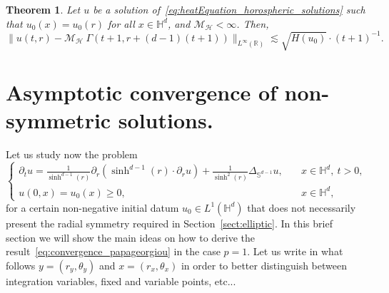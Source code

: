 \documentclass[12pt,longbibliography]{article}
\def\R{\mathbb{R}}
\def\d{\,\mathrm{d}}
\def\R{\mathbb{R}}
\def\d{\,\mathrm{d}}
\def\H{\mathbb{H}}
\newtheorem{thm}{Theorem}[section]
\theoremstyle{definition}
\theoremstyle{remark}
\theoremstyle{example}
\begin{document}
\begin{thm}\label{thm:convregece_horoshepric_L^infty}
	Let $u$ be a solution of~\eqref{eq:heatEquation_horospheric_solutions} such that $u_0(x)=u_0(r)$ for all $x\in\H^d$, and $\mathcal{M}_{\mathcal{H}}<\infty$. Then,
	\[
	\|u(t,r)- \mathcal{M}_{\mathcal{H}}\ \Gamma(t+1, r+(d-1)(t+1)) \|_{L^\infty(\R)} \lesssim \sqrt{H(u_0)} \cdot (t+1)^{-1}.
	\]
\end{thm}
%
%
% 



\section{Asymptotic convergence of non-symmetric solutions.}\label{sect:convergence_integrable_no_rates}

Let us study now the problem
\begin{equation}\label{eq:laplace_beltrami_polar_coordinates_general data}
	\begin{cases}
		\partial_t u = \frac{1}{\sinh^{d-1}(r)}\partial_r\left(\sinh^{d-1}(r)\cdot \partial_r u\right) + \frac{1}{\sinh^2(r)}\Delta_{\mathbb{S}^{d-1}}u,\quad &x\in\H^d,\ t>0, \\[10pt]
		u(0,x)=u_0(x)\geq 0,&x\in\H^d,
	\end{cases}
\end{equation}
for a certain non-negative initial datum $u_0\in L^1(\H^d)$ that does not necessarily present the radial symmetry required in Section~\ref{sect:elliptic}. In this brief section we will show the main ideas on how to derive the result~\eqref{eq:convergence_papageorgiou} in the case $p=1$. Let us write in what follows $y=(r_y, \theta_y)$ and $x=(r_x, \theta_x)$ in order to better distinguish between integration variables, fixed and variable points, etc...
\end{document}
